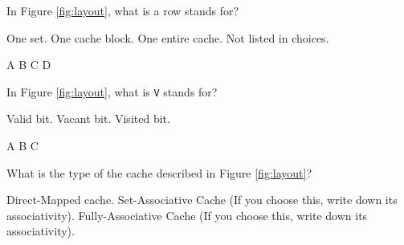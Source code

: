 \begin{questions}

\question[2] In Figure \ref{fig:layout}, what is a row stands for?
{

    \begin{oneparchoices}
        \choice One set.
        \choice One cache block.
        \choice One entire cache.
        \choice Not listed in choices.
    \end{oneparchoices}
    
    \begin{solution}
        \begin{oneparcheckboxes}
            \CorrectChoice A
            \choice B
            \choice C
            \choice D
        \end{oneparcheckboxes}
    \end{solution}

}

\question[2] In Figure \ref{fig:layout}, what is \texttt{V} stands
for?
{

    \begin{oneparchoices}
        \choice Valid bit.
        \choice Vacant bit.
        \choice Visited bit.
    \end{oneparchoices}
    
    \begin{solution}
        \begin{oneparcheckboxes}
            \CorrectChoice A
            \choice B
            \choice C
        \end{oneparcheckboxes}
    \end{solution}

}

\question[2] What is the type of the cache described in Figure \ref{fig:layout}?
{

    \begin{choices}
        \choice Direct-Mapped cache.
        \choice Set-Associative Cache (If you choose this, write
        down its associativity).
        \choice Fully-Associative Cache (If you choose this, write
        down its associativity).
    \end{choices}
    
}
\end{questions}
